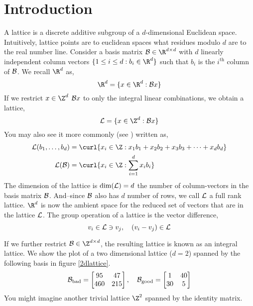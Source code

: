 \documentclass{homework}
\begin{document}
\begin{abstract}
  \blindtext
\end{abstract}
\maketitle


\section{Introduction}\label{intro}

A lattice is a discrete additive subgroup of a $d$-dimensional
Euclidean space. Intuitively, lattice points are to euclidean spaces
what residues modulo $d$ are to the real number line. Consider a basis
matrix $\B \in \R^{d \times d}$ with $d$ linearly independent column
vectors $\{1 \leq i \leq d : b_i \in \R^d\}$ such that $b_i$ is the
$i^\text{th}$ column of $\mathcal{B}$. We recall $\R^d$ as,
\[
  \R^d = \{x \in \R^d : \B x\}
\]
If we restrict $x\in \Z^d$ \ie $\mathcal{B} x$ to only the integral linear
combinations, we obtain a lattice,
\[
  \L = \{x \in \Z^d : \B x\}
\]
You may also see it more commonly (see
\cite{micciancio2002complexity}) written as,
\begin{align*}
  \L(b_1,\dots,b_d)
         & = \curl{x_i \in \Z : x_1b_1 + x_2b_2 + x_3b_3 + \cdots + x_db_d} \\
  \L(\B) & = \curl{x_i \in \Z : \sum_{i=1}^{d}x_ib_i}
\end{align*}
The dimension of the lattice is $\dim(\mathcal{L}) = d$ \ie the number of
column-vectors in the basis matrix $\mathcal{B}$. And--since $\mathcal{B}$ also has $d$
number of rows, we call $\mathcal{L}$ a full rank lattice. $\R^d$ is now the
ambient space for the reduced set of vectors that are in the lattice
$\mathcal{L}$. The group operation of a lattice is the vector difference,
\[
  v_i \in \mathcal{L} \ni v_j,\quad (v_i - v_j) \in \mathcal{L}
\]

If we further restrict $\B \in \Z^{d \times d}$, the resulting lattice
is known as an integral lattice. We show the plot of a two dimensional
lattice ($d=2$) spanned by the following basis in figure
\ref{2dlattice}.
\[
  \mathcal{B}_\text{bad} =
  \begin{bmatrix}
    95  & 47  \\
    460 & 215
  \end{bmatrix},
  \quad
  \mathcal{B}_\text{good} =
  \begin{bmatrix}
    1  & 40 \\
    30 & 5
  \end{bmatrix}
\]
You might imagine another trivial lattice $\Z^2$ spanned by the
identity matrix.
\end{document}
